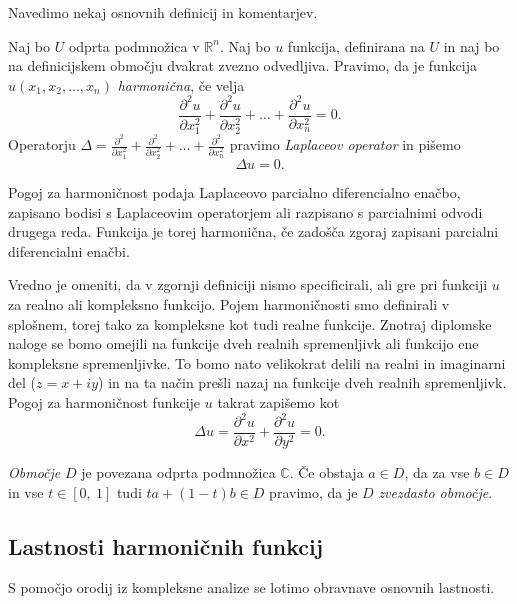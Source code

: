 \documentclass[mat1, tisk]{fmfdelo}
\begin{document}
    Navedimo nekaj osnovnih definicij in komentarjev.

    \begin{definicija}
        \label{harm}
        Naj bo $U$ odprta podmnožica v $\mathbb{R}^n$. Naj bo $u$ funkcija, definirana na $U$ in naj bo na definicijskem območju dvakrat zvezno odvedljiva.  
        Pravimo, da je funkcija $u(x_1, x_2, \dots, x_n)$ \emph{harmonična}, če velja
        $$
        \frac{\partial^2 u}{\partial x_1 ^ 2} +  \frac{\partial^2 u}{\partial x_2 ^ 2} + \dots + \frac{\partial^2 u}{\partial x_n ^ 2} = 0.
        $$
        Operatorju $\Delta  = \frac{\partial^2}{\partial x_1 ^ 2} +  \frac{\partial^2}{\partial x_2 ^ 2} + \dots + \frac{\partial^2}{\partial x_n ^ 2}$ pravimo \emph{Laplaceov operator} in pišemo
        $$
        \Delta u = 0.
        $$
    \end{definicija}

    Pogoj za harmoničnost podaja Laplaceovo parcialno diferencialno enačbo, zapisano bodisi s Laplaceovim operatorjem ali razpisano s parcialnimi odvodi drugega reda. 
    Funkcija je torej harmonična, če zadošča zgoraj zapisani parcialni diferencialni enačbi. 

    Vredno je omeniti, da v zgornji definiciji nismo specificirali, ali gre pri funkciji $u$ za realno ali kompleksno funkcijo. 
    Pojem harmoničnosti smo definirali v splošnem, torej tako za kompleksne kot tudi realne funkcije.
    Znotraj diplomske naloge se bomo omejili na funkcije dveh realnih spremenljivk ali funkcijo ene kompleksne spremenljivke. To bomo nato velikokrat delili na realni in imaginarni del ($z = x + iy $) in na ta način prešli nazaj na funkcije dveh realnih spremenljivk.
    Pogoj za harmoničnost funkcije $u$ takrat zapišemo kot
        $$
            \Delta u = \frac{\partial^2 u}{\partial x ^ 2} +  \frac{\partial^2 u}{\partial y ^ 2}= 0.
        $$

    \begin{definicija}
        \emph{Območje} $D$ je povezana odprta podmnožica $\mathbb{C}$.
        Če obstaja $a \in D$, da za vse $b \in D$ in vse $t \in [0,~1]$ tudi $t a + (1-t)b \in D$ pravimo, da je $D$ \emph{zvezdasto območje}.
    \end{definicija}

\subsection{Lastnosti harmoničnih funkcij}

    S pomočjo orodij iz kompleksne analize se lotimo obravnave osnovnih lastnosti. 
\end{document}
